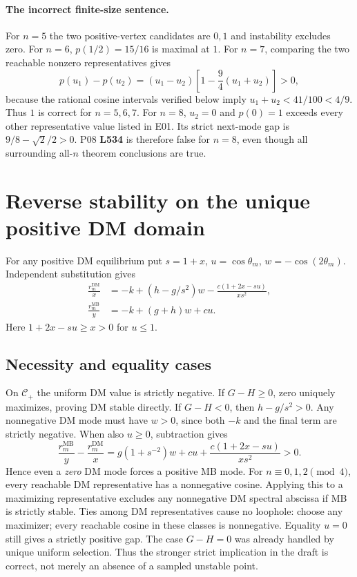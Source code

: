 \documentclass[11pt]{article}
\newcommand{\DM}{\mathrm{DM}}
\newcommand{\MB}{\mathrm{MB}}
\newcommand{\lin}[1]{\textbf{L#1}}
\begin{document}
\paragraph{The incorrect finite-size sentence.}
For $n=5$ the two positive-vertex candidates are $0,1$ and instability
excludes zero. For $n=6$, $p(1/2)=15/16$ is maximal at $1$. For
$n=7$, comparing the two reachable nonzero representatives gives
\[
 p(u_1)-p(u_2)=(u_1-u_2)\left[1-\frac94(u_1+u_2)\right]>0,
\]
because the rational cosine intervals verified below imply
$u_1+u_2<41/100<4/9$. Thus $1$ is correct for $n=5,6,7$.
For $n=8$, $u_2=0$ and $p(0)=1$ exceeds every other representative
value listed in E01. Its strict next-mode gap is
$9/8-\sqrt2/2>0$. P08 \lin{534} is therefore false for $n=8$,
even though all surrounding all-$n$ theorem conclusions are true.

\section{Reverse stability on the unique positive DM domain}
For any positive DM equilibrium put $s=1+x$, $u=\cos\theta_m$,
$w=-\cos(2\theta_m)$. Independent substitution gives
\begin{align*}
 \frac{r_m^{\DM}}x&=-k+(h-g/s^2)w-
                  \frac{c(1+2x-su)}{xs^2},\\
 \frac{r_m^{\MB}}{y}&=-k+(g+h)w+cu.
\end{align*}
Here $1+2x-su\ge x>0$ for $u\le1$.

\subsection{Necessity and equality cases}
On $\mathcal C_+$ the uniform DM value is strictly negative. If
$G-H\ge0$, zero uniquely maximizes, proving DM stable directly.
If $G-H<0$, then $h-g/s^2>0$. Any nonnegative DM mode must have
$w>0$, since both $-k$ and the final term are strictly negative.
When also $u\ge0$, subtraction gives
\[
 \frac{r_m^{\MB}}y-\frac{r_m^{\DM}}x
 =g(1+s^{-2})w+cu+\frac{c(1+2x-su)}{xs^2}>0.
\]
Hence even a \emph{zero} DM mode forces a positive MB mode. For
$n\equiv0,1,2\pmod4$, every reachable DM representative has a
nonnegative cosine. Applying this to a maximizing representative
excludes any nonnegative DM spectral abscissa if MB is strictly stable.
Ties among DM representatives cause no loophole: choose any maximizer;
every reachable cosine in these classes is nonnegative. Equality
$u=0$ still gives a strictly positive gap. The case $G-H=0$ was
already handled by unique uniform selection. Thus the stronger strict
implication in the draft is correct, not merely an absence of a sampled
unstable point.
\end{document}
